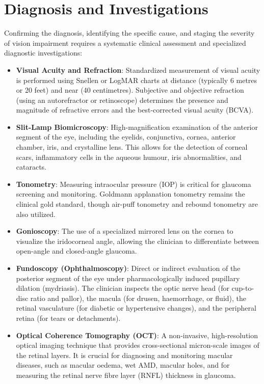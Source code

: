 \section*{Diagnosis and Investigations}
Confirming the diagnosis, identifying the specific cause, and staging the severity of vision impairment requires a systematic clinical assessment and specialized diagnostic investigations:
\begin{itemize}
    \item \textbf{Visual Acuity and Refraction}: Standardized measurement of visual acuity is performed using Snellen or LogMAR charts at distance (typically 6 metres or 20 feet) and near (40 centimetres). Subjective and objective refraction (using an autorefractor or retinoscope) determines the presence and magnitude of refractive errors and the best-corrected visual acuity (BCVA).
    \item \textbf{Slit-Lamp Biomicroscopy}: High-magnification examination of the anterior segment of the eye, including the eyelids, conjunctiva, cornea, anterior chamber, iris, and crystalline lens. This allows for the detection of corneal scars, inflammatory cells in the aqueous humour, iris abnormalities, and cataracts.
    \item \textbf{Tonometry}: Measuring intraocular pressure (IOP) is critical for glaucoma screening and monitoring. Goldmann applanation tonometry remains the clinical gold standard, though air-puff tonometry and rebound tonometry are also utilized.
    \item \textbf{Gonioscopy}: The use of a specialized mirrored lens on the cornea to visualize the iridocorneal angle, allowing the clinician to differentiate between open-angle and closed-angle glaucoma.
    \item \textbf{Fundoscopy (Ophthalmoscopy)}: Direct or indirect evaluation of the posterior segment of the eye under pharmacologically induced pupillary dilation (mydriasis). The clinician inspects the optic nerve head (for cup-to-disc ratio and pallor), the macula (for drusen, haemorrhage, or fluid), the retinal vasculature (for diabetic or hypertensive changes), and the peripheral retina (for tears or detachments).
    \item \textbf{Optical Coherence Tomography (OCT)}: A non-invasive, high-resolution optical imaging technique that provides cross-sectional micron-scale images of the retinal layers. It is crucial for diagnosing and monitoring macular diseases, such as macular oedema, wet AMD, macular holes, and for measuring the retinal nerve fibre layer (RNFL) thickness in glaucoma.

\end{itemize}
